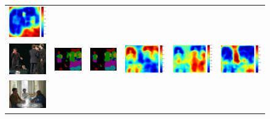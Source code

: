 \documentclass[10pt,twocolumn,letterpaper]{article}
\begin{document}
\begin{figure}
\begin{tabular}{c c c c c c}
   \includegraphics[height=0.13\linewidth]{fig/voc10_part/att3/2008_003344.pdf} \\
   \includegraphics[height=0.11\linewidth]{fig/voc10_part/img/2008_003825.jpg} &
   \includegraphics[height=0.11\linewidth]{fig/voc10_part/res_baseline/2008_003825.png} &
   \includegraphics[height=0.11\linewidth]{fig/voc10_part/res_sharenet/2008_003825.png} &
   \includegraphics[height=0.11\linewidth]{fig/voc10_part/att1/2008_003825.pdf} &
   \includegraphics[height=0.11\linewidth]{fig/voc10_part/att2/2008_003825.pdf} &
   \includegraphics[height=0.11\linewidth]{fig/voc10_part/att3/2008_003825.pdf} \\
   \includegraphics[height=0.1\linewidth]{fig/voc10_part/img/2010_005626.jpg} &

\end{tabular}
\end{figure}
\end{document}
